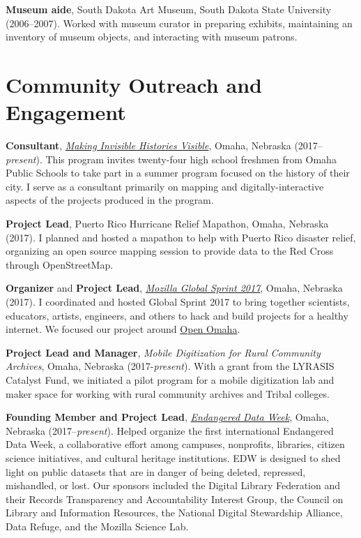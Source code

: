 \textbf{Museum aide}, South Dakota Art Museum, South Dakota State
University (2006--2007). Worked with museum curator in preparing
exhibits, maintaining an inventory of museum objects, and interacting
with museum patrons.

\section{Community Outreach and
Engagement}\label{community-outreach-and-engagement}

\textbf{Consultant}, \emph{\href{http://invisiblehistory.ops.org}{Making
Invisible Histories Visible}}, Omaha, Nebraska (2017--\emph{present}).
This program invites twenty-four high school freshmen from Omaha Public
Schools to take part in a summer program focused on the history of their
city. I serve as a consultant primarily on mapping and
digitally-interactive aspects of the projects produced in the program.

\textbf{Project Lead}, Puerto Rico Hurricane Relief Mapathon, Omaha,
Nebraska (2017). I planned and hosted a mapathon to help with Puerto
Rico disaster relief, organizing an open source mapping session to
provide data to the Red Cross through OpenStreetMap.

\textbf{Organizer} and \textbf{Project Lead},
\emph{\href{https://mozilla.github.io/global-sprint/}{Mozilla Global
Sprint 2017}}, Omaha, Nebraska (2017). I coordinated and hosted Global
Sprint 2017 to bring together scientists, educators, artists, engineers,
and others to hack and build projects for a healthy internet. We focused
our project around \href{http://github.com/open-omaha/}{Open Omaha}.

\textbf{Project Lead and Manager}, \emph{Mobile Digitization for Rural
Community Archives}, Omaha, Nebraska (2017-\emph{present}). With a grant
from the LYRASIS Catalyst Fund, we initiated a pilot program for a
mobile digitization lab and maker space for working with rural community
archives and Tribal colleges.

\textbf{Founding Member and Project Lead},
\emph{\href{http://endangereddataweek.org}{Endangered Data Week}},
Omaha, Nebraska (2017--\emph{present}). Helped organize the first
international Endangered Data Week, a collaborative effort among
campuses, nonprofits, libraries, citizen science initiatives, and
cultural heritage institutions. EDW is designed to shed light on public
datasets that are in danger of being deleted, repressed, mishandled, or
lost. Our sponsors included the Digital Library Federation and their
Records Transparency and Accountability Interest Group, the Council on
Library and Information Resources, the National Digital Stewardship
Alliance, Data Refuge, and the Mozilla Science Lab.

